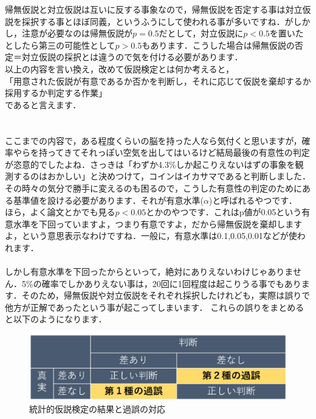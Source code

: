 \documentclass[11pt,a4paper,uplatex]{ujreport} 	%
\begin{document}
帰無仮説と対立仮説は互いに反する事象なので，帰無仮説を否定する事は対立仮説を採択する事とほぼ同義，というふうにして使われる事が多いですね．がしかし，注意が必要なのは帰無仮説が$p=0.5$だとして，対立仮説に$p<0.5$を置いたとしたら第三の可能性として$p>0.5$もあります．こうした場合は帰無仮説の否定＝対立仮説の採択とは違うので気を付ける必要があります．\\


以上の内容を言い換え，改めて仮説検定とは何か考えると，\\
「用意された仮説が有意であるか否かを判断し，それに応じて仮説を棄却するか採用するか判定する作業」\\
であると言えます．\\
\\
\\

ここまでの内容で，ある程度くらいの脳を持った人なら気付くと思いますが，確率やらを持ってきてそれっぽい空気を出してはいるけど結局最後の有意性の判定が恣意的でしたよね．さっきは「わずか4.3\%しか起こりえないはずの事象を観測するのはおかしい」と決めつけて，コインはイカサマであると判断しました．\\

その時々の気分で勝手に変えるのも困るので，こうした有意性の判定のためにある基準値を設ける必要があります．それが有意水準($\alpha$)と呼ばれるやつです．\\

ほら，よく論文とかでも見る$p<0.05$とかのやつです．これはp値が0.05という有意水準を下回っていますよ，つまり有意ですよ，だから帰無仮説を棄却しますよ，という意思表示なわけですね．一般に，有意水準は0.1,0.05,0.01などが使われます．\\
\\

しかし有意水準を下回ったからといって，絶対にありえないわけじゃありません．5\%の確率でしかありえない事は，20回に1回程度は起こりうる事でもあります．そのため，帰無仮説や対立仮説をそれぞれ採択したけれども，実際は誤りで他方が正解であったという事が起こってしまいます．
これらの誤りをまとめると以下のようになります．

\begin{figure}[H]
  \includegraphics[width=12cm]{../figures/miss.eps}
  \caption{統計的仮説検定の結果と過誤の対応}
\end{figure}
\end{document}
